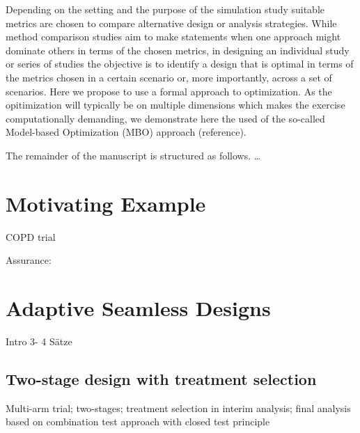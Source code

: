 \documentclass[bimj,fleqn]{w-art}
\theoremstyle{plain}
\theoremstyle{definition}
\begin{document}
Depending on the setting and the purpose of the simulation study suitable metrics are chosen to compare alternative design or analysis strategies. 
While method comparison studies aim to make statements when one approach might dominate others in terms of the chosen metrics, in designing an individual study or series of studies the objective is to identify a design that is optimal in terms of the metrics chosen in a certain scenario or, more importantly, across a set of scenarios. 
Here we propose to use a formal approach to optimization. As the opitimization will typically be on multiple dimensions which makes the exercise computationally demanding, we demonstrate here the used of the so-called Model-based Optimization (MBO) approach (reference).

The remainder of the manuscript is structured as follows. \dots 



\section{Motivating Example}
COPD trial
\cite{friede_adaptive_2020}

\cite{cuffe_when_2014}

Assurance: \cite{stallard_optimal_2009}

\section{Adaptive Seamless Designs}
Intro 3- 4 Sätze

\subsection{Two-stage design with treatment selection}
Multi-arm trial; two-stages; treatment selection in interim analysis; final analysis based on combination test approach with closed test principle

\end{document}
